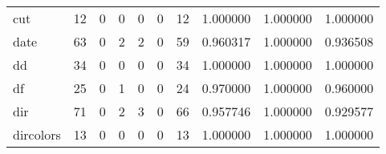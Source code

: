 \begin{tabular}{lrrrrrrrrr}
cut       &                                      12 &                                                  0 &                                                  0 &                                                  0 &                                                  0 &                                                 12 &                                           1.000000 &                               1.000000 &                             1.000000 \\
date      &                                      63 &                                                  0 &                                                  2 &                                                  2 &                                                  0 &                                                 59 &                                           0.960317 &                               1.000000 &                             0.936508 \\
dd        &                                      34 &                                                  0 &                                                  0 &                                                  0 &                                                  0 &                                                 34 &                                           1.000000 &                               1.000000 &                             1.000000 \\
df        &                                      25 &                                                  0 &                                                  1 &                                                  0 &                                                  0 &                                                 24 &                                           0.970000 &                               1.000000 &                             0.960000 \\
dir       &                                      71 &                                                  0 &                                                  2 &                                                  3 &                                                  0 &                                                 66 &                                           0.957746 &                               1.000000 &                             0.929577 \\
dircolors &                                      13 &                                                  0 &                                                  0 &                                                  0 &                                                  0 &                                                 13 &                                           1.000000 &                               1.000000 &                             1.000000 \\

\end{tabular}
